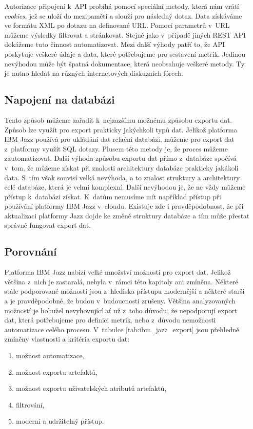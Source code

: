 \documentclass[czech,master]{diploma}
\begin{document}
Autorizace připojení k~API probíhá pomocí speciální metody, která nám vrátí \textit{cookies}, jež se uloží do mezipaměti a slouží pro následný dotaz. Data získáváme ve formátu XML po dotazu na definované URL. Pomocí parametrů v~URL můžeme výsledky filtrovat a stránkovat. Stejně jako v~případě jiných REST API dokážeme tuto činnost automatizovat. Mezi další výhody patří to, že API poskytuje veškeré údaje a data, které potřebujeme pro sestavení metrik. Jedinou nevýhodou může být špatná dokumentace, která neobsahuje veškeré metody. Ty je nutno hledat na různých internetových diskuzních fórech.

\subsection{Napojení na databázi}
Tento způsob můžeme zařadit k~nejzazšímu možnému způsobu exportu dat. Způsob lze využít pro export prakticky jakýchkoli typů dat. Jelikož platforma IBM Jazz používá pro ukládání dat relační databázi, můžeme pro export dat z~platformy využít SQL dotazy. Plusem této metody je, že proces můžeme zautomatizovat. Další výhoda způsobu exportu dat přímo z~databáze spočívá v~tom, že můžeme získat při znalosti architektury databáze prakticky jakákoli data. S~tím však souvisí velká nevýhoda, a to znalost struktury a architektury celé databáze, která je velmi komplexní. Další nevýhodou je, že ne vždy můžeme přístup k~databázi získat. K~datům nemusíme mít například přístup při používání platformy IBM Jazz v~cloudu. Existuje zde i pravděpodobnost, že při aktualizaci platformy Jazz dojde ke změně struktury databáze a tím může přestat správně fungovat export dat.

\subsection{Porovnání}
Platforma IBM Jazz nabízí velké množství možností pro export dat. Jelikož většina z~nich je zastaralá, nebyla v~rámci této kapitoly ani zmíněna. Některé stále podporované možnosti jsou z~hlediska přístupu modernější a některé starší a je pravděpodobné, že budou v~budoucnosti zrušeny. Většina analyzovaných možností je bohužel nevyhovující ať už z~toho důvodu, že nepodporují export dat, která potřebujeme pro definici metrik, nebo z~důvodu nemožnosti automatizace celého procesu. V~tabulce \ref{tab:ibm_jazz_export} jsou přehledně zmíněny vlastnosti a kritéria exportu dat:

\begin{enumerate}
\item možnost automatizace,
\item možnost exportu artefaktů,
\item možnost exportu uživatelských atributů artefaktů,
\item filtrování,
\item moderní a udržitelný přístup.
\end{enumerate}
\end{document}
